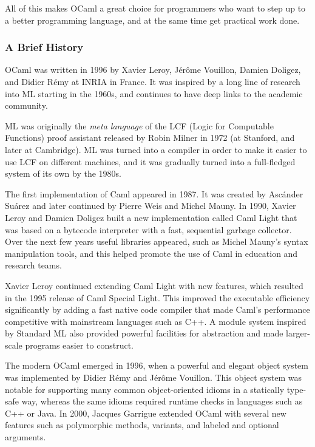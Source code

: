 All of this makes OCaml a great choice for programmers who want to step
up to a better programming language, and at the same time get practical
work done.

\hypertarget{a-brief-history}{%
\subsubsection{A Brief History}\label{a-brief-history}}

OCaml was written in 1996 by Xavier Leroy, Jérôme Vouillon, Damien
Doligez, and Didier Rémy at INRIA in France. It was inspired by a long
line of research into ML starting in the 1960s, and continues to have
deep links to the academic community.

ML was originally the \emph{meta language} of the LCF (Logic for
Computable Functions) proof assistant released by Robin Milner in 1972
(at Stanford, and later at Cambridge). ML was turned into a compiler in
order to make it easier to use LCF on different machines, and it was
gradually turned into a full-fledged system of its own by the 1980s.

The first implementation of Caml appeared in 1987. It was created by
Ascánder Suárez and later continued by Pierre Weis and Michel Mauny. In
1990, Xavier Leroy and Damien Doligez built a new implementation called
Caml Light that was based on a bytecode interpreter with a fast,
sequential garbage collector. Over the next few years useful libraries
appeared, such as Michel Mauny's syntax manipulation tools, and this
helped promote the use of Caml in education and research teams.

Xavier Leroy continued extending Caml Light with new features, which
resulted in the 1995 release of Caml Special Light. This improved the
executable efficiency significantly by adding a fast native code
compiler that made Caml's performance competitive with mainstream
languages such as C++. A module system inspired by Standard ML also
provided powerful facilities for abstraction and made larger-scale
programs easier to construct.

The modern OCaml emerged in 1996, when a powerful and elegant object
system was implemented by Didier Rémy and Jérôme Vouillon. This object
system was notable for supporting many common object-oriented idioms in
a statically type-safe way, whereas the same idioms required runtime
checks in languages such as C++ or Java. In 2000, Jacques Garrigue
extended OCaml with several new features such as polymorphic methods,
variants, and labeled and optional arguments.

